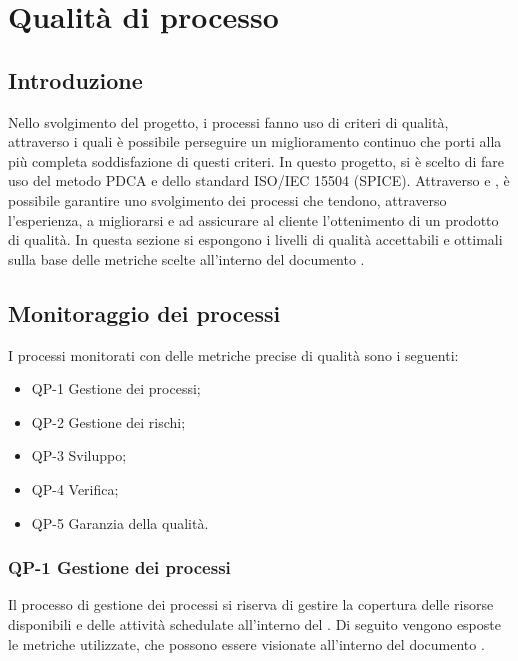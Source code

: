 \section{Qualità di processo}

\subsection{Introduzione}

Nello svolgimento del progetto, i processi fanno uso di criteri di qualità, attraverso i quali è possibile perseguire un miglioramento continuo che porti alla più completa soddisfazione di questi criteri.
\newline
In questo progetto, si è scelto di fare uso del metodo PDCA e dello standard ISO/IEC 15504 (SPICE). Attraverso  e , è possibile garantire uno svolgimento dei processi che tendono, attraverso l'esperienza, a migliorarsi e ad assicurare al cliente l'ottenimento di un prodotto di qualità.
\newline
In questa sezione si espongono i livelli di qualità accettabili e ottimali sulla base delle metriche scelte all'interno del documento .

\subsection{Monitoraggio dei processi}

I processi monitorati con delle metriche precise di qualità sono i seguenti:

\begin{itemize}
	\item QP-1 Gestione dei processi;
	\item QP-2 Gestione dei rischi;
 	\item QP-3 Sviluppo;
	\item QP-4 Verifica;
	\item QP-5 Garanzia della qualità.
\end{itemize}

	\subsubsection{QP-1 Gestione dei processi}

		Il processo di gestione dei processi si riserva di gestire la copertura delle risorse disponibili e delle attività schedulate all'interno del .
		\newline
		Di seguito vengono esposte le metriche utilizzate, che possono essere visionate all'interno del documento .

